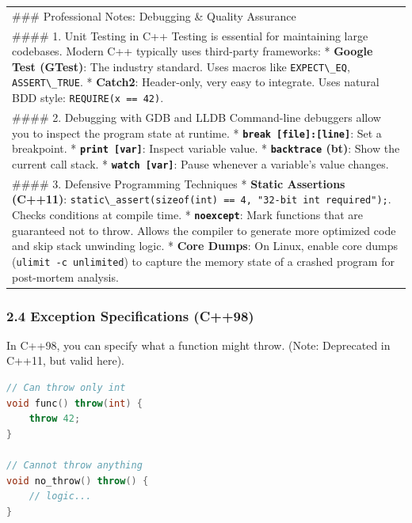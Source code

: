 \begin{longtable}[]{@{}
  >{\raggedright\arraybackslash}p{}@{}}
\toprule
\endhead
\#\#\# Professional Notes: Debugging \& Quality Assurance \\
\#\#\#\# 1. Unit Testing in C++ Testing is essential for maintaining
large codebases. Modern C++ typically uses third-party frameworks: *
\textbf{Google Test (GTest)}: The industry standard. Uses macros like
\passthrough{\lstinline!EXPECT\_EQ!},
\passthrough{\lstinline!ASSERT\_TRUE!}. * \textbf{Catch2}: Header-only,
very easy to integrate. Uses natural BDD style:
\passthrough{\lstinline!REQUIRE(x == 42)!}. \\
\#\#\#\# 2. Debugging with GDB and LLDB Command-line debuggers allow you
to inspect the program state at runtime. *
\textbf{\passthrough{\lstinline!break [file]:[line]!}}: Set a
breakpoint. * \textbf{\passthrough{\lstinline!print [var]!}}: Inspect
variable value. * \textbf{\passthrough{\lstinline!backtrace!} (bt)}:
Show the current call stack. *
\textbf{\passthrough{\lstinline!watch [var]!}}: Pause whenever a
variable's value changes. \\
\#\#\#\# 3. Defensive Programming Techniques * \textbf{Static Assertions
(C++11)}:
\passthrough{\lstinline!static\_assert(sizeof(int) == 4, "32-bit int required");!}.
Checks conditions at compile time. *
\textbf{\passthrough{\lstinline!noexcept!}}: Mark functions that are
guaranteed not to throw. Allows the compiler to generate more optimized
code and skip stack unwinding logic. * \textbf{Core Dumps}: On Linux,
enable core dumps (\passthrough{\lstinline!ulimit -c unlimited!}) to
capture the memory state of a crashed program for post-mortem
analysis. \\
\bottomrule
\end{longtable}

\hypertarget{exception-specifications-c98}{%
\subsubsection{2.4 Exception Specifications
(C++98)}\label{exception-specifications-c98}}

In C++98, you can specify what a function might throw. (Note: Deprecated
in C++11, but valid here).

\begin{lstlisting}[language={C++}]
// Can throw only int
void func() throw(int) {
    throw 42;
}

// Cannot throw anything
void no_throw() throw() {
    // logic...
}
\end{lstlisting}

